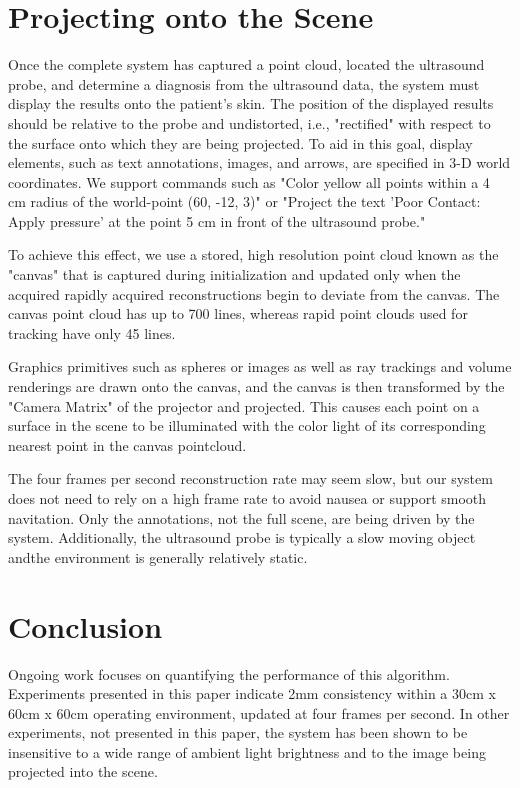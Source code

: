 \documentclass{llncs}
\begin{document}
\section{Projecting onto the Scene}

Once the complete system has captured a point cloud, located the ultrasound probe, and determine a diagnosis from the ultrasound data, the system must display the results onto the patient's skin. The position of the displayed results should be relative to the probe and undistorted, i.e., "rectified" with respect to the surface onto which they are being projected. To aid in this goal, display elements, such as text annotations, images, and arrows, are specified in 3-D world coordinates. We support commands such as "Color yellow all points within a 4 cm radius of the world-point (60, -12, 3)" or "Project the text 'Poor Contact: Apply pressure' at the point 5 cm in front of the ultrasound probe."

To achieve this effect, we use a stored, high resolution point cloud known as the "canvas" that is captured during initialization and updated only when the acquired rapidly acquired reconstructions begin to deviate from the canvas. The canvas point cloud has up to 700 lines, whereas rapid point clouds used for tracking have only 45 lines. 

Graphics primitives such as spheres or images as well as ray trackings and volume renderings are drawn onto the canvas, and the canvas is then transformed by the "Camera Matrix" of the projector and projected. This causes each point on a surface in the scene to be illuminated with the color light of its corresponding nearest point in the canvas pointcloud. 

The four frames per second reconstruction rate may seem slow, but our system does not need to rely on a high frame rate to avoid nausea or support smooth navitation. Only the annotations, not the full scene, are being driven by the system. Additionally, the ultrasound probe is typically a slow moving object andthe environment is generally relatively static.

\section{Conclusion}
Ongoing work focuses on quantifying the performance of this algorithm.  Experiments presented in this paper indicate 2mm consistency within a 30cm x 60cm x 60cm operating environment, updated at four frames per second.  In other experiments, not presented in this paper, the system has been shown to be insensitive to a wide range of ambient light brightness and to the image being projected into the scene.
\end{document}
